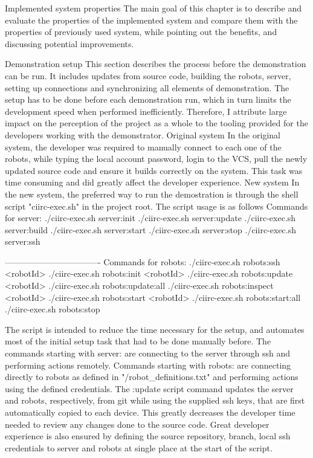 \chap Implemented system properties
The main goal of this chapter is to describe and evaluate the properties of the implemented system and compare them with the properties of previously used system, while pointing out the benefits, and discussing potential improvements.

\sec Demonstration setup
This section describes the process before the demonstration can be run. It includes updates from source code, building the robots, server, setting up connections and synchronizing all elements of demonstration. \br
The setup has to be done before each demonstration run, which in turn limits the development speed when performed inefficiently. Therefore, I attribute large impact on the perception of the project as a whole to the tooling provided for the developers working with the demonstrator.
\secc Original system
In the original system, the developer was required to manually connect to each one of the robots, while typing the local account password, login to the VCS, pull the newly updated source code and ensure it builds correctly on the system. This task was time consuming and did greatly affect the developer experience.
\secc New system
In the new system, the preferred way to run the demostration is through the shell script "ciirc-exec.sh" in the project root. The script usage is as follows
\begtt
Commands for server:
./ciirc-exec.sh server:init
./ciirc-exec.sh server:update
./ciirc-exec.sh server:build
./ciirc-exec.sh server:start
./ciirc-exec.sh server:stop
./ciirc-exec.sh server:ssh

----------------------------------
Commands for robots:
./ciirc-exec.sh robots:ssh <robotId>
./ciirc-exec.sh robots:init <robotId>
./ciirc-exec.sh robots:update <robotId>
./ciirc-exec.sh robots:update:all
./ciirc-exec.sh robots:inspect <robotId>
./ciirc-exec.sh robots:start <robotId>
./ciirc-exec.sh robots:start:all
./ciirc-exec.sh robots:stop
\endtt

The script is intended to reduce the time necessary for the setup, and automates most of the initial setup task that had to be done manually before.
The commands starting with server: are connecting to the server through ssh and performing actions remotely. Commands starting with robots: are connecting directly to robots as defined in "/robot_definitions.txt" and performing actions using the defined credentials. The :update script command updates the server and robots, respectively, from git while using the supplied ssh keys, that are first automatically copied to each device. \br
This greatly decreases the developer time needed to review any changes done to the source code. Great developer experience is also ensured by defining the source repository, branch, local ssh credentials to server and robots at single place at the start of the script.

